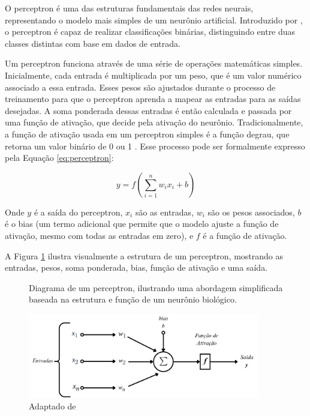 
O perceptron é uma das estruturas fundamentais das redes neurais, representando o modelo mais simples de um neurônio artificial. Introduzido por , o perceptron é capaz de realizar classificações binárias, distinguindo entre duas classes distintas com base em dados de entrada.

Um perceptron funciona através de uma série de operações matemáticas simples. Inicialmente, cada entrada é multiplicada por um peso, que é um valor numérico associado a essa entrada. Esses pesos são ajustados durante o processo de treinamento para que o perceptron aprenda a mapear as entradas para as saídas desejadas. A soma ponderada dessas entradas é então calculada e passada por uma função de ativação, que decide pela ativação do neurônio. Tradicionalmente, a função de ativação usada em um perceptron simples é a função degrau, que retorna um valor binário de 0 ou 1 \cite{hertz2018introduction}. Esse processo pode ser formalmente expresso pela Equação \ref{eq:perceptron}:

\begin{equation}
    y = f\left(\sum_{i=1}^{n} w_i x_i + b\right)
    \label{eq:perceptron}
\end{equation}


Onde $y$ é a saída do perceptron, $x_i$ são as entradas, $w_i$ são os pesos associados, $b$ é o bias (um termo adicional que permite que o modelo ajuste a função de ativação, mesmo com todas as entradas em zero), e $f$ é a função de ativação.

A Figura \ref{fig:perceptron} ilustra visualmente a estrutura de um perceptron, mostrando as entradas, pesos, soma ponderada, bias, função de ativação e uma saída.

\begin{figure}[hb!]
    \centering  
    \caption{Diagrama de um perceptron, ilustrando uma abordagem simplificada baseada na estrutura e função de um neurônio biológico.} 
    \includegraphics[width=0.9\textwidth]{fig/perceptron.png}
    \caption*{Adaptado de }
    \label{fig:perceptron}
\end{figure}

